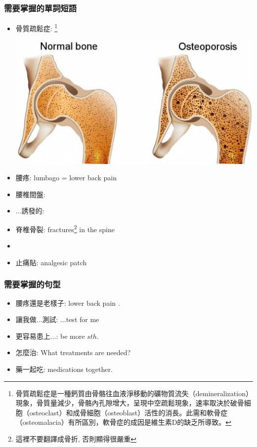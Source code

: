\subsubsection*{需要掌握的單詞短語}
\begin{multicols}{2}
\begin{itemize}
  \itemsep0em
  \item 骨質疏鬆症: \footnote{骨質疏鬆症是一種鈣質由骨骼往血液淨移動的礦物質流失（demineralization）現象，骨質量減少，骨骼內孔隙增大，呈現中空疏鬆現象，速率取決於破骨細胞（osteoclast）和成骨細胞（osteoblast）活性的消長。此需和軟骨症（osteomalacia）有所區別，軟骨症的成因是維生素D的缺乏所導致。}
  \begin{center}
  	\includegraphics[scale=.5]{pics/osteoporotic}
  \end{center}
  \item 腰疼: lumbago = lower back pain
  \item 腰椎間盤: 
  \item ...誘發的: 
  \item 脊椎骨裂: fractures\footnote{這裡不要翻譯成骨折, 否則顯得很嚴重} in the spine
  \item {}
  \item 止痛貼: analgesic patch
\end{itemize}
\end{multicols}

\subsubsection*{需要掌握的句型}
\begin{multicols}{2}
\begin{itemize}
  \itemsep0em
  \item 腰疼還是老樣子: lower back pain .
  \item 讓我做...測試: ...test for me
  \item 更容易患上...: be more  $sth.$
  \item 怎麼治: What treatments are needed?
  \item 藥一起吃: medications  together.
\end{itemize}
\end{multicols}

